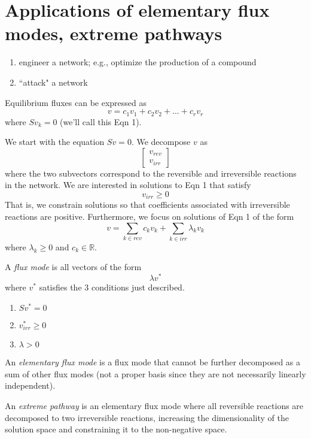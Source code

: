 \documentclass[10pt]{article}
\newenvironment{menumerate}
{
  \begin{enumerate}
  \setlength{\itemsep}{1pt}
  \setlength{\parskip}{0pt}
  \setlength{\parsep}{0pt}}{\end{enumerate}
}
\begin{document}
\section*{Applications of elementary flux modes, extreme pathways}
\begin{menumerate}
  \item engineer a network; e.g., optimize the production of a compound
  \item ``attack" a network
\end{menumerate}

Equilibrium fluxes can be expressed as \[ v = c_1 v_1 + c_2 v_2 + ... + c_r v_r \] where $S v_k = 0$ (we'll call this Eqn 1).

We start with the equation $S v = 0$. We decompose $v$ as \[ \begin{bmatrix} v_{rev} \\ v_{irr} \end{bmatrix} \] where the two subvectors correspond to the reversible and irreversible reactions in the network. We are interested in solutions to Eqn 1 that satisfy \[ v_{irr} \geq 0 \] That is, we constrain solutions so that coefficients associated with irreversible reactions are positive. Furthermore, we focus on solutions of Eqn 1 of the form \[ v = \sum_{k \in rev} c_k v_k + \sum_{k \in irr} \lambda_k v_k \] where $\lambda_k \geq 0$ and $c_k \in \mathbb{R}$.

A \emph{flux mode} is all vectors of the form \[ \lambda v^* \] where $v^*$ satisfies the 3 conditions just described.
\begin{menumerate}
  \item $S v^* = 0$
  \item $v^*_{irr} \geq 0$
  \item $\lambda > 0$
\end{menumerate}

An \emph{elementary flux mode} is a flux mode that cannot be further decomposed as a sum of other flux modes (not a proper basis since they are not necessarily linearly independent).

An \emph{extreme pathway} is an elementary flux mode where all reversible reactions are decomposed to two irreversible reactions, increasing the dimensionality of the solution space and constraining it to the non-negative space.
\end{document}
